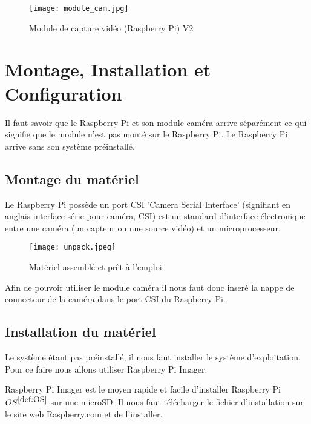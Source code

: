         \begin{figure}[ht]
            \centering        
            \texttt{[image: module\_cam.jpg]}
            \caption{Module de capture vidéo (Raspberry Pi) V2}
        \end{figure}
        
    \section{Montage, Installation et Configuration}
        Il faut savoir que le Raspberry Pi et son module caméra arrive séparément ce qui signifie que le module n’est pas monté sur le Raspberry Pi.
        Le Raspberry Pi arrive sans son système préinstallé.
            \subsection{Montage du matériel}
            Le Raspberry Pi possède un port CSI 'Camera Serial Interface' (signifiant en anglais interface série pour caméra, CSI) est un standard d'interface électronique entre une caméra (un capteur ou une source vidéo) et un microprocesseur.

            \begin{figure}[ht]
                \centering
                \texttt{[image: unpack.jpeg]} 
                \caption{Matériel assemblé et prêt à l'emploi}
            \end{figure}

            \vspace{0.2cm}

            Afin de pouvoir utiliser le module caméra il nous faut donc inseré la nappe de connecteur de la caméra dans le port CSI du Raspberry Pi.
            \subsection{Installation du matériel}
            Le système étant pas préinstallé, il nous faut installer le système d'exploitation.
            Pour ce faire nous allons utiliser Raspberry Pi Imager.

            \vspace{0.2cm}

            
            Raspberry Pi Imager est le moyen rapide et facile d'installer Raspberry Pi \underline{$OS^{\ref{def:OS}}$} sur une microSD.
            Il nous faut télécharger le fichier d'installation sur le site web Raspberry.com et de l'installer.

